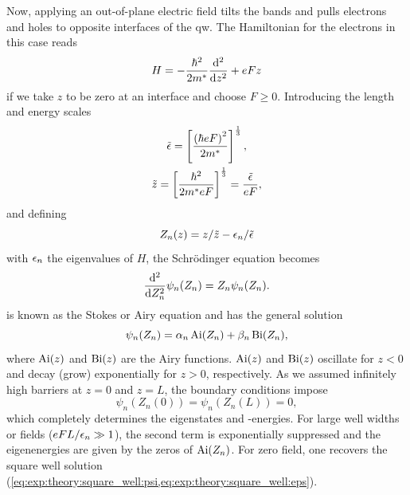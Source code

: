 Now, applying an out-of-plane electric field tilts the bands and pulls electrons and holes to opposite interfaces of the \gls{qw}.
The Hamiltonian for the electrons in this case reads~\cite{Rabinovitch1971,Miller1985,Davies2009}
\begin{equation}\label{eq:exp:theory:qcse:hamiltonian}
    H = -\frac{\hbar^2}{2m^\ast}\dv[2]{z} + eFz
\end{equation}
if we take $z$ to be zero at an interface and choose $F \geq 0$.
Introducing the length and energy scales~\cite{Davies2009}
\begin{gather}
    \tilde{\epsilon} = \left[\frac{\left(\hbar eF\right)^2}{2m^\ast}\right]^{\frac{1}{3}}, \\
    \tilde{z} = \left[\frac{\hbar^2}{2m^\ast eF}\right]^{\frac{1}{3}} = \frac{\tilde{\epsilon}}{eF},
\end{gather}
and defining
\begin{equation}
    Z_n(z) = z/\tilde{z} - \epsilon_n/\tilde{\epsilon}
\end{equation}
with $\epsilon_n$ the eigenvalues of $H$, the Schrödinger equation becomes~\cite{Rabinovitch1971}
\begin{equation}\label{eq:exp:theory:qcse:se}
    \dv[2]{Z_n}\psi_n(Z_n) = Z_n\psi_n(Z_n).
\end{equation}
 is known as the Stokes or Airy equation and has the general solution
\begin{equation}
    \psi_n(Z_n) = \alpha_n\operatorname{Ai}(Z_n) + \beta_n\operatorname{Bi}(Z_n),
\end{equation}
where $\operatorname{Ai}(z)$ and $\operatorname{Bi}(z)$ are the Airy functions.
$\operatorname{Ai}(z)$ and $\operatorname{Bi}(z)$ oscillate for $z < 0$ and decay (grow) exponentially for $z > 0$, respectively.
As we assumed infinitely high barriers at $z = 0$ and $z = L$, the boundary conditions impose
\begin{equation}
    \psi_n(Z_n(0)) = \psi_n(Z_n(L)) = 0,
\end{equation}
which completely determines the eigenstates and -energies.
For large well widths or fields ($eFL/\epsilon_n\gg 1$), the second term is exponentially suppressed and the eigenenergies are given by the zeros of $\operatorname{Ai}(Z_n)$.
For zero field, one recovers the square well solution (\cref{eq:exp:theory:square_well:psi,eq:exp:theory:square_well:eps}).

